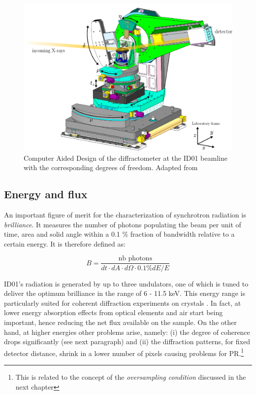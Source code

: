 \begin{figure}[H]
    \centering
    \includegraphics[width=\textwidth]{figures/Intro/beamline.pdf}
    \caption{Computer Aided Design of the diffractometer at the ID01 beamline with the corresponding degrees of freedom. 
    Adapted from \cite{Atlan2023}}
    \label{fig:diffractometer}
\end{figure}

\subsection{Energy and flux}
An important figure of merit for the characterization of synchrotron radiation is \textit{brilliance}. It measures 
the number of photons populating the beam per unit of time, area and solid angle within a 0.1 $\%$ fraction of bandwidth relative 
to a certain energy. 
It is therefore defined as:

\begin{equation}
    B = \frac{\text{nb photons}}{dt \cdot dA \cdot d\Omega \cdot 0.1\% dE/E} 
\end{equation} 
 
ID01's radiation is generated by up to three undulators, one of which is tuned to deliver the optimum brilliance 
in the range of 6 - 11.5 keV. This energy range is particularly suited for coherent diffraction experiments on crystals . 
In fact, at lower energy absorption effects from optical elements and air start being important, hence reducing the net 
flux available on the sample. On the other hand, at higher energies other problems arise, namely: (i) the degree of  
coherence drops significantly (see next paragraph) and (ii) the diffraction patterns, for fixed detector distance, shrink 
in a lower number of pixels causing problems for PR.\footnote[1]{ 
This is related to the concept of the \textit{oversampling condition} discussed in the next chapter}

